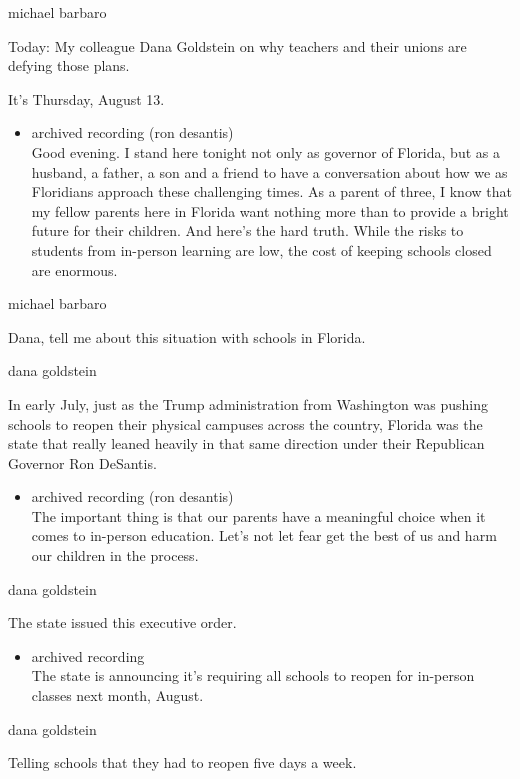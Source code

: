 michael barbaro

Today: My colleague Dana Goldstein on why teachers and their unions are
defying those plans.

It's Thursday, August 13.

\begin{itemize}
\tightlist
\item
  archived recording (ron desantis)\\
  Good evening. I stand here tonight not only as governor of Florida,
  but as a husband, a father, a son and a friend to have a conversation
  about how we as Floridians approach these challenging times. As a
  parent of three, I know that my fellow parents here in Florida want
  nothing more than to provide a bright future for their children. And
  here's the hard truth. While the risks to students from in-person
  learning are low, the cost of keeping schools closed are enormous.
\end{itemize}

michael barbaro

Dana, tell me about this situation with schools in Florida.

dana goldstein

In early July, just as the Trump administration from Washington was
pushing schools to reopen their physical campuses across the country,
Florida was the state that really leaned heavily in that same direction
under their Republican Governor Ron DeSantis.

\begin{itemize}
\tightlist
\item
  archived recording (ron desantis)\\
  The important thing is that our parents have a meaningful choice when
  it comes to in-person education. Let's not let fear get the best of us
  and harm our children in the process.
\end{itemize}

dana goldstein

The state issued this executive order.

\begin{itemize}
\tightlist
\item
  archived recording\\
  The state is announcing it's requiring all schools to reopen for
  in-person classes next month, August.
\end{itemize}

dana goldstein

Telling schools that they had to reopen five days a week.

